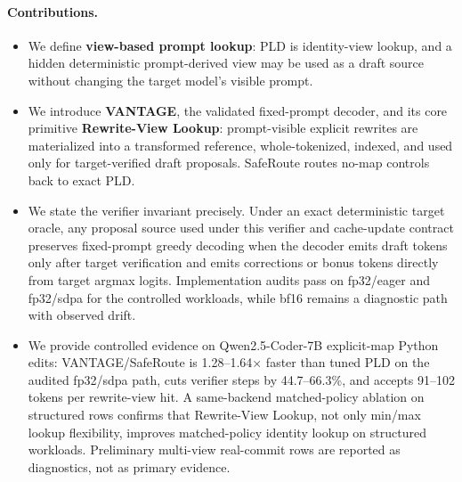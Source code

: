 \documentclass[11pt,a4paper]{article}
\begin{document}
\paragraph{Contributions.}
\begin{itemize}
\item We define \textbf{view-based prompt lookup}: PLD is identity-view lookup,
  and a hidden deterministic prompt-derived view may be used as a draft source
  without changing the target model's visible prompt.
\item We introduce \textbf{VANTAGE}, the validated fixed-prompt decoder, and
  its core primitive \textbf{Rewrite-View Lookup}: prompt-visible explicit
  rewrites are materialized into a transformed reference, whole-tokenized,
  indexed, and used only for target-verified draft proposals. SafeRoute routes
  no-map controls back to exact PLD.
\item We state the verifier invariant precisely. Under an exact deterministic
  target oracle, any proposal source used under this verifier and cache-update
  contract preserves fixed-prompt greedy decoding when the decoder emits draft
  tokens only after target verification and emits corrections or bonus tokens
  directly from target argmax logits.
  Implementation audits pass on fp32/eager and fp32/sdpa for the controlled
  workloads, while bf16 remains a diagnostic path with observed drift.
\item We provide controlled evidence on Qwen2.5-Coder-7B explicit-map Python
  edits: VANTAGE/SafeRoute is 1.28--1.64$\times$ faster than tuned PLD on the
  audited fp32/sdpa path, cuts verifier steps by 44.7--66.3\%, and accepts
  91--102 tokens per rewrite-view hit. A same-backend matched-policy
  ablation on structured rows confirms that Rewrite-View Lookup, not only min/max lookup
  flexibility, improves matched-policy identity lookup on structured
  workloads. Preliminary multi-view real-commit rows are reported as
  diagnostics, not as primary evidence.
\end{itemize}

\begin{center}
\end{center}
\end{document}
